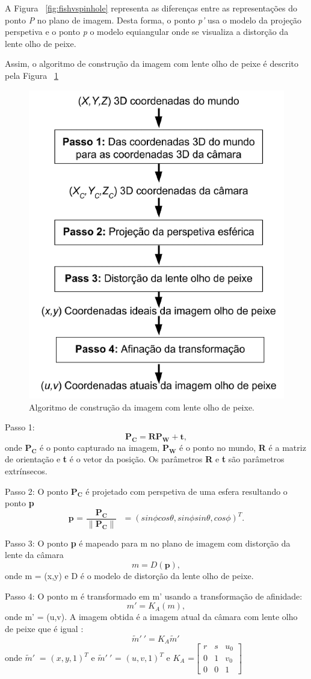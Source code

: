 A Figura ~\ref{fig:fishvspinhole} representa as diferenças entre as representações do ponto \textit{P} no plano de imagem. Desta forma, o ponto \textit{p'} usa o modelo da projeção perspetiva e o ponto \textit{p} o modelo equiangular onde se visualiza a distorção da lente olho de peixe.

Assim, o algoritmo de construção da imagem com lente olho de peixe é descrito pela Figura ~\ref{fig:fisheyealgortim}

\begin{figure}[h!]
	\centering
	\includegraphics[width=0.4\linewidth]{figures/fisheyealgortimpt}
	\caption{Algoritmo de construção da imagem com lente olho de peixe. \cite{Ying2006}}
	\label{fig:fisheyealgortim}
\end{figure}

Passo 1:  \[ \textbf{P}_\textbf{C} = \textbf{R}\textbf{P}_\textbf{W} + \textbf{t}, \] onde $\textbf{P}_\textbf{C}$ é o ponto capturado na imagem, $\textbf{P}_\textbf{W}$ é o ponto no mundo, \textbf{R} é a matriz de orientação e \textbf{t} é o vetor da posição. Os parâmetros \textbf{R} e \textbf{t} são parâmetros extrínsecos. 

Passo 2: O ponto $\textbf{P}_\textbf{C}$ é projetado com perspetiva de uma esfera resultando o ponto \textbf{p} \[ \textbf{p = $\frac{\textbf{P}_\textbf{C}}{ \| \textbf{P}_\textbf{C} \| }$ } = ( sin \phi cos \theta, sin \phi sin \theta, cos \phi)^T  . \]

Passo 3: O ponto \textbf{p} é mapeado para m no plano de imagem com distorção da lente da câmara \[ m = D(\textbf{p}), \] onde m = (x,y) e D é o modelo de distorção da lente olho de peixe. 

Passo 4: O ponto m é transformado em m' usando a transformação de afinidade: \[ m' = K_A(m), \] onde m' = (u,v). A imagem obtida é a imagem atual da câmara com lente olho de peixe que é igual : \[ \widetilde{m}'\ ' = K_A \widetilde{m}'\,\] onde $\widetilde{m}'\ $ = $(x,y,1)^T$ e $\widetilde{m}'\ '$ = $(u,v,1)^T$ e $K_A$ =$\left[ \begin{array}{ccc}
r & s & u_0 \\ 
0 & 1 & v_0 \\ 
0 & 0 & 1
\end{array} \right]$ 



